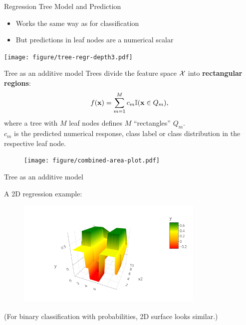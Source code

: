 \documentclass[11pt,compress,t,notes=noshow, xcolor=table]{beamer}
\begin{document}
\begin{vbframe}{Regression Tree Model and Prediction}
  \begin{itemize}
    \item Works the same way as for classification
    \item But predictions in leaf nodes are a numerical scalar

  \end{itemize}
\vspace{1cm}
\color{fgcolor}
{\centering \texttt{[image: figure/tree-regr-depth3.pdf]}

}

\end{vbframe}



\begin{vbframe}{Tree as an additive model}
Trees divide the feature space $\mathcal{X}$ into \textbf{rectangular regions}: 
  \begin{align*}
    f(\mathbf{x}) = \sum_{m=1}^M c_m \mathbb{I}(\mathbf{x} \in Q_m),
  \end{align*}
  where a tree with $M$ leaf nodes defines $M$ \enquote{rectangles} $Q_m$.\\
  $c_m$ is the predicted numerical response, class label or class
  distribution in the respective leaf node.
  \begin{figure}
\texttt{[image: figure/combined-area-plot.pdf]}
\end{figure}

\end{vbframe}

\begin{vbframe}{Tree as an additive model}

A 2D regression example: 
\lz
\begin{figure} 
\includegraphics[width=0.8\textwidth, keepaspectratio]{figure_man/tree-contin-surface3d.png}
\end{figure}


(For binary classification with probabilities, 2D surface looks similar.)

\end{vbframe}
\end{document}
